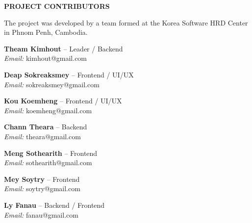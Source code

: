 {\raggedright \noindent \textbf{\Large PROJECT CONTRIBUTORS}\par}
\vspace{0.3cm}

\noindent
The \projname{} project was developed by a team formed at the Korea Software HRD Center in Phnom Penh, Cambodia.

\vspace{1em}

\noindent
\begin{minipage}[t]{0.48\linewidth}
  \textbf{Theam Kimhout} -- Leader / Backend \\
  \textit{Email:} kimhout@gmail.com
\end{minipage}%
\hfill
\begin{minipage}[t]{0.48\linewidth}
  \textbf{Deap Sokreaksmey} -- Frontend / UI/UX \\
  \textit{Email:} sokreaksmey@gmail.com
\end{minipage}

\vspace{1em}

\noindent
\begin{minipage}[t]{0.48\linewidth}
  \textbf{Kou Koemheng} -- Frontend / UI/UX \\
  \textit{Email:} koemheng@gmail.com
\end{minipage}%
\hfill
\begin{minipage}[t]{0.48\linewidth}
  \textbf{Chann Theara} -- Backend \\
  \textit{Email:} theara@gmail.com
\end{minipage}

\vspace{1em}

\noindent
\begin{minipage}[t]{0.48\linewidth}
  \textbf{Meng Sothearith} -- Frontend \\
  \textit{Email:} sothearith@gmail.com
\end{minipage}%
\hfill
\begin{minipage}[t]{0.48\linewidth}
  \textbf{Mey Soytry} -- Frontend \\
  \textit{Email:} soytry@gmail.com
\end{minipage}

\vspace{1em}

\noindent
\begin{minipage}[t]{0.48\linewidth}
  \textbf{Ly Fanau} -- Backend / Frontend \\
  \textit{Email:} fanau@gmail.com
\end{minipage}

\vspace{1.5em}
